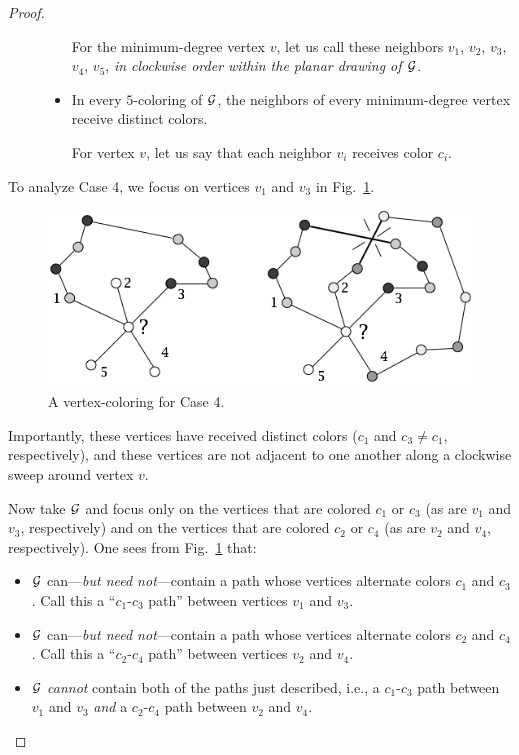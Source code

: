 \begin{proof}
\begin{description}
\begin{itemize}
\smallskip

For the minimum-degree vertex $v$, let us call these neighbors $v_1$, $v_2$, $v_3$, $v_4$, $v_5$, {\em in clockwise order within the planar drawing of $\mbox{$\cal G$}$}.
\medskip\item
In every $5$-coloring of $\mbox{$\cal G$}$, the neighbors of every minimum-degree vertex receive distinct colors.

\smallskip

For vertex $v$, let us say that each neighbor $v_i$ receives color $c_i$.
\end{itemize}
\end{description}
To analyze Case 4, we focus on vertices $v_1$ and $v_3$ in Fig.~\ref{fig:5colorsCase4}.
\begin{figure}[hbt]
\begin{center}
   \includegraphics[scale=0.38]{FiguresGraph/5colorsCase2}
\caption{A vertex-coloring for Case 4.}
  \label{fig:5colorsCase4}
\end{center}
\end{figure}
Importantly, these vertices have received distinct colors ($c_1$ and $c_3 \neq c_1$, respectively), and these vertices are not adjacent to one another along a clockwise sweep around vertex $v$.

\smallskip

Now take $\mbox{$\cal G$}$ and focus only on the vertices that are colored $c_1$ or $c_3$ (as are $v_1$ and $v_3$, respectively) and on the vertices that are colored $c_2$ or $c_4$ (as are $v_2$ and $v_4$, respectively).  One sees from Fig.~\ref{fig:5colorsCase4} that:
\begin{itemize}
\item
$\mbox{$\cal G$}$ can---{\em but need not}---contain a path whose vertices alternate  colors $c_1$ and $c_3$. Call this a ``$c_1$-$c_3$ path'' between vertices $v_1$ and $v_3$.
\medskip\item
$\mbox{$\cal G$}$ can---{\em but need not}---contain a path whose vertices alternate colors $c_2$ and $c_4$.  Call this a ``$c_2$-$c_4$ path'' between vertices $v_2$ and $v_4$.
\medskip\item
$\mbox{$\cal G$}$ {\em cannot} contain both of the paths just described, i.e., a $c_1$-$c_3$ path between $v_1$ and $v_3$ {\em and} a $c_2$-$c_4$ path between $v_2$ and $v_4$.


\end{itemize}
\end{proof}
